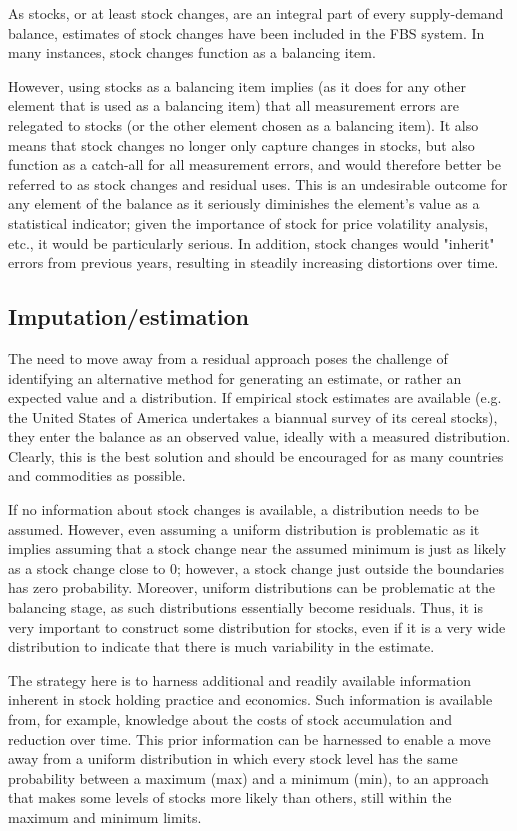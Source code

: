 \documentclass[nojss]{jss}\usepackage[]{graphicx}\usepackage[]{color}
\begin{document}
As stocks, or at least stock changes, are an integral part of every supply-demand balance, estimates of stock changes have been included in the FBS system. In many instances, stock changes function as a balancing item.

However, using stocks as a balancing item implies (as it does for any other element that is used as a balancing item) that all measurement errors are relegated to stocks (or the other element chosen as a balancing item). It also means that stock changes no longer only capture changes in stocks, but also function as a catch-all for all measurement errors, and would therefore better be referred to as stock changes and residual uses. This is an undesirable outcome for any element of the balance as it seriously diminishes the element's value as a statistical indicator; given the importance of stock for price volatility analysis, etc., it would be particularly serious. In addition, stock changes would "inherit" errors from previous years, resulting in steadily increasing distortions over time. 

\subsection{Imputation/estimation}

The need to move away from a residual approach poses the challenge of identifying an alternative method for generating an estimate, or rather an expected value and a distribution. If empirical stock estimates are available (e.g. the United States of America undertakes a biannual survey of its cereal stocks), they enter the balance as an observed value, ideally with a measured distribution. Clearly, this is the best solution and should be encouraged for as many countries and commodities as possible. 

If no information about stock changes is available, a distribution needs to be assumed. However, even assuming a uniform distribution is problematic as it implies assuming that a stock change near the assumed minimum is just as likely as a stock change close to 0; however, a stock change just outside the boundaries has zero probability. Moreover, uniform distributions can be problematic at the balancing stage, as such distributions essentially become residuals. Thus, it is very important to construct some distribution for stocks, even if it is a very wide distribution to indicate that there is much variability in the estimate.

The strategy here is to harness additional and readily available information inherent in stock holding practice and economics. Such information is available from, for example, knowledge about the costs of stock accumulation and reduction over time. This prior information can be harnessed to enable a move away from a uniform distribution in which every stock level has the same probability between a maximum (max) and a minimum (min), to an approach that makes some levels of stocks more likely than others, still within the maximum and minimum limits.
\end{document}
